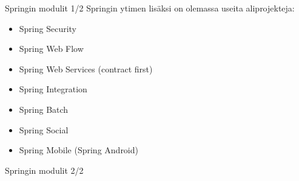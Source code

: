 \documentclass[hyperref={pdfauthor=\AUTHOR},14pt]{beamer}
\begin{document}
\begin{frame}{Springin modulit 1/2}
Springin ytimen lisäksi on olemassa useita aliprojekteja:
\begin{itemize}
\item Spring Security
\item Spring Web Flow
\item Spring Web Services (contract first)
\item Spring Integration 
\item Spring Batch
\item Spring Social
\item Spring Mobile (Spring Android)
\end{itemize}
\end{frame}

\begin{frame}{Springin modulit 2/2}
\end{frame}

\end{document}
